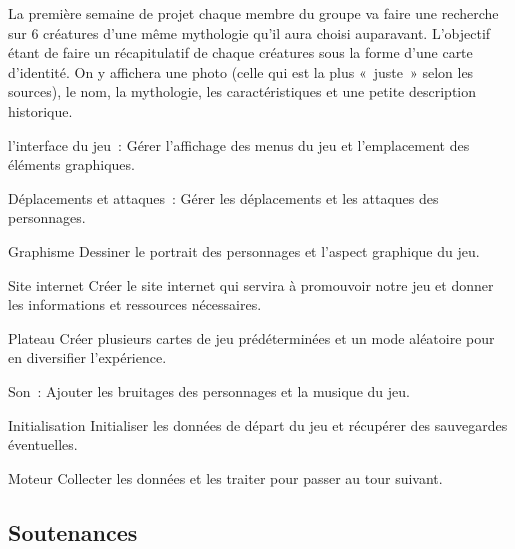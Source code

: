 \documentclass[12pt]{extarticle}
\begin{document}
La première semaine de projet chaque membre du groupe va faire une recherche sur 6 créatures d’une même mythologie qu’il aura choisi auparavant. L’objectif étant de faire un récapitulatif de chaque créatures sous la forme d’une carte d’identité. On y affichera une photo (celle qui est la plus « juste » selon les sources), le nom, la mythologie, les caractéristiques et une petite description historique. 




l’interface du jeu : 
Gérer l’affichage des menus du jeu et l’emplacement des éléments graphiques. 

Déplacements et attaques :
Gérer les déplacements et les attaques des personnages.

Graphisme
Dessiner le portrait des personnages et l’aspect graphique du jeu.

Site internet
Créer le site internet qui servira à promouvoir notre jeu et donner les informations et ressources nécessaires.

Plateau
Créer plusieurs cartes de jeu prédéterminées et un mode aléatoire pour en diversifier l’expérience.

Son :
Ajouter les bruitages des personnages et la musique du jeu.

Initialisation
Initialiser les données de départ du jeu et récupérer des sauvegardes éventuelles.

Moteur
Collecter les données et les traiter pour passer au tour suivant.

\newpage

\subsection{Soutenances}
\end{document}
